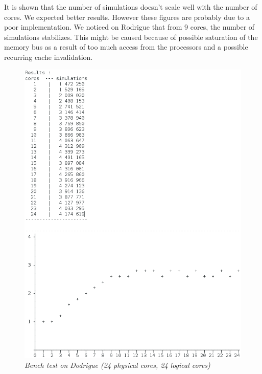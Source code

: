 It is shown that the number of simulations doesn't scale well with the number of cores. We expected better results. However these figures are probably due to a poor implementation. We noticed on Rodrigue that from 9 cores, the number of simulations stabilizes. This might be caused because of possible saturation of the memory bus as a result of too much access from the processors and a possible recurring cache invalidation.

\begin{figure}[H] 
\centerline{\includegraphics[width=\textwidth]{Optimisations/bench_rodrigue.png}}
\caption{\label{fig:Defrag}\textit{Bench test on Dodrigue (24 physical cores, 24 logical cores)}}
\end{figure}


